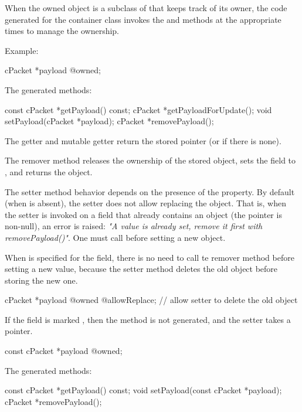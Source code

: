 When the owned object is a subclass of  that keeps track of
its owner, the code generated for the container class invokes the 
and  methods at the appropriate times to manage the ownership.

Example:

\begin{msg}
cPacket *payload @owned;
\end{msg}

The generated methods:

\begin{cpp}
const cPacket *getPayload() const;
cPacket *getPayloadForUpdate();
void setPayload(cPacket *payload);
cPacket *removePayload();
\end{cpp}

The getter and mutable getter return the stored pointer (or  if
there is none).

The remover method releases the ownership of the stored object, sets the field
to , and returns the object.

The setter method behavior depends on the presence of the 
property. By default (when  is absent), the setter does not
allow replacing the object. That is, when the setter is invoked on a field that
already contains an object (the pointer is non-null), an error is raised:
\textit{"A value is already set, remove it first with removePayload()"}.
One must call  before setting a new object.

When  is specified for the field, there is no need to call
te remover method before setting a new value, because the setter method deletes
the old object before storing the new one.

\begin{msg}
cPacket *payload @owned @allowReplace; // allow setter to delete the old object
\end{msg}

If the field is marked , then the  method
is not generated, and the setter takes a  pointer.

\begin{msg}
const cPacket *payload @owned;
\end{msg}

The generated methods:

\begin{cpp}
const cPacket *getPayload() const;
void setPayload(const cPacket *payload);
cPacket *removePayload();
\end{cpp}

